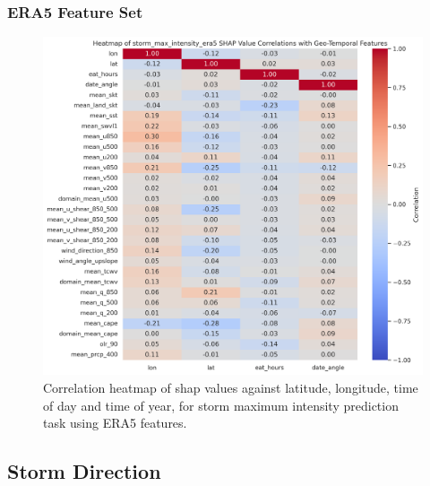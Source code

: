 \subsubsection{ERA5 Feature Set}
\begin{figure}[ht]
    \centering
    \includegraphics[width=\textwidth]{../figures/generated/experiments/storm_max_intensity/storm_max_intensity_era5_shap_correlation_heatmap.png}
    \caption{Correlation heatmap of \acrshort{shap} values against latitude, longitude, time of day and time of year, for storm maximum intensity prediction task using ERA5 features.}
    \label{fig:storm_max_intensity_era5_shap_heatmap}
\end{figure}

\subsection{Storm Direction}
\label{appn:shap-heatmaps-sd}

